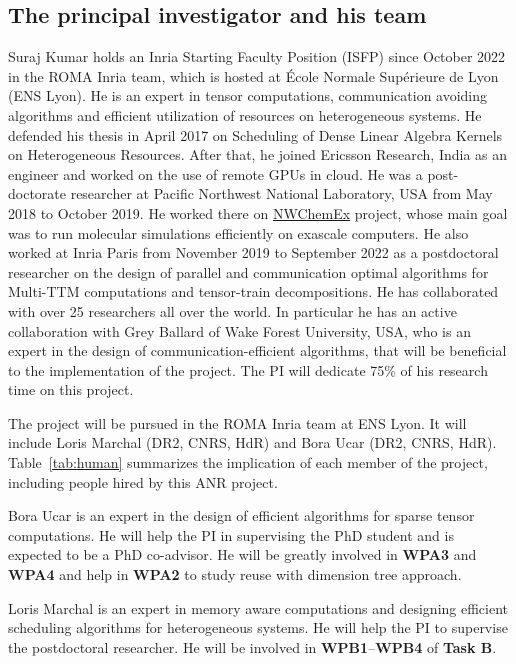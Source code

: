 \documentclass[a4paper,11pt]{article}
\begin{document}
	\vspace*{-0.35cm}\subsection{The principal investigator and his team}
	\label{sec:org:team}
	Suraj Kumar holds an Inria Starting Faculty Position (ISFP) since October 2022 in the ROMA Inria team, which is hosted at École Normale Supérieure de Lyon (ENS Lyon). He is an expert in tensor computations, communication avoiding algorithms and efficient utilization of resources on heterogeneous systems. He defended his thesis in April 2017 on Scheduling of Dense Linear Algebra Kernels on Heterogeneous Resources. After that, he joined Ericsson Research, India as an engineer and worked on the use of remote GPUs in cloud. He was a post-doctorate researcher at Pacific Northwest National Laboratory, USA from May 2018 to October 2019. He worked there on \href{https://www.exascaleproject.org/research-project/nwchemex}{NWChemEx} project, whose main goal was to run molecular simulations efficiently on exascale computers. He also worked at Inria Paris from November 2019 to September 2022 as a postdoctoral researcher on the design of parallel and communication optimal algorithms for Multi-TTM computations and tensor-train decompositions. He has collaborated with over 25 researchers all over the world. In particular he has an active collaboration with Grey Ballard of Wake Forest University, USA, who is an expert in the design of communication-efficient algorithms, that will be beneficial to the implementation of the project. The PI will dedicate 75\% of his research time on this project.
	
	
	
	The project will be pursued in the ROMA Inria team at ENS Lyon. It will include Loris Marchal (DR2, CNRS, HdR) and Bora Ucar (DR2, CNRS, HdR). Table~\ref{tab:human} summarizes the implication of each member of the project, including people hired by this ANR project.
	
		
	Bora Ucar is an expert in the design of efficient algorithms for sparse tensor computations. He will help the PI in supervising the PhD student and is expected to be a PhD co-advisor. He will be greatly involved in \textbf{WPA3} and \textbf{WPA4} and help in \textbf{WPA2} to study reuse with dimension tree approach.
	
	
	Loris Marchal is an expert in memory aware computations and designing efficient scheduling algorithms for heterogeneous systems. He will help the PI to supervise the postdoctoral researcher. He will be involved in \textbf{WPB1}--\textbf{WPB4} of \textbf{Task B}.
	
\end{document}

